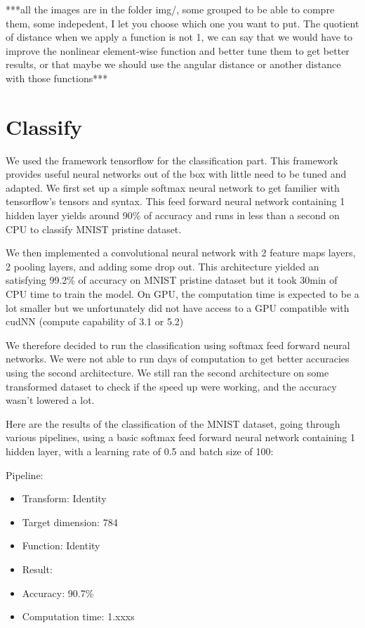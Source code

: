 \documentclass[11pt,a4paper]{article}
\begin{document}
	
	***all the images are in the folder img/, some grouped to be able to compre them, some indepedent, I let you choose which one you want to put. The quotient of distance when we apply a function is not 1, we can say that we would have to improve the nonlinear element-wise function and better tune them to get better results, or that maybe we should use the angular distance or another distance with those functions***
	
	\section{Classify}
	We used the framework tensorflow for the classification part. This framework provides useful neural networks out of the box with little need to be tuned and adapted. We first set up a simple softmax neural network to get familier with tensorflow's tensors and syntax. This feed forward neural network containing 1 hidden layer yields around 90\% of accuracy and runs in less than a second on CPU to classify MNIST pristine dataset.
	
	
	We then implemented a convolutional neural network with 2 feature maps layers, 2 pooling layers, and adding some drop out. This architecture yielded an satisfying 99.2\% of accuracy on MNIST pristine dataset but it took 30min of CPU time to train the model. On GPU, the computation time is expected to be a lot smaller but we unfortunately did not have access to a GPU compatible with cudNN (compute capability of 3.1 or 5.2)
	
	
	We therefore decided to run the classification using softmax feed forward neural networks. We were not able to run days of computation to get better accuracies using the second architecture. We still ran the second architecture on some transformed dataset to check if the speed up were working, and the accuracy wasn't lowered a lot. 
	
	
	Here are the results of the classification of the MNIST dataset, going through various pipelines, using a basic softmax feed forward neural network containing 1 hidden layer, with a learning rate of 0.5 and batch size of 100:
	
	Pipeline:
	\begin{itemize}
			\item Transform: Identity
			\item Target dimension: 784
			\item Function: Identity
			\item Result:
			\item Accuracy: 90.7\%
			\item Computation time: 1.xxxs
	\end{itemize}
\end{document}

